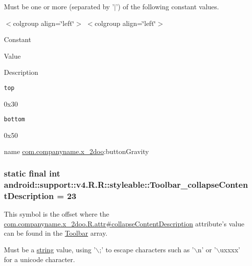 Must be one or more (separated by '$|$') of the following constant values. \begin{TabularC}{0}
\hline
\end{TabularC}
$<$colgroup align=\char`\"{}left\char`\"{}$>$ $<$colgroup align=\char`\"{}left\char`\"{}$>$ 

Constant

Value

Description 

{\tt top}

0x30

{\tt bottom}

0x50

name \hyperlink{namespacecom_1_1companyname_1_1x__2doo}{com.companyname.x\_\-2doo}:buttonGravity \hypertarget{classandroid_1_1support_1_1v4_1_1_r_1_1styleable_052a3e0cd00166bf0033ee070e9469d0}{
\subsubsection[{Toolbar\_\-collapseContentDescription}]{\setlength{\rightskip}{0pt plus 5cm}static final int android::support::v4.R.R::styleable::Toolbar\_\-collapseContentDescription = 23}}
\label{classandroid_1_1support_1_1v4_1_1_r_1_1styleable_052a3e0cd00166bf0033ee070e9469d0}


This symbol is the offset where the \hyperlink{classcom_1_1companyname_1_1x__2doo_1_1_r_1_1attr_1e672a257f5b406cbfc4774d38a8e4fd}{com.companyname.x\_\-2doo.R.attr\#collapseContentDescription} attribute's value can be found in the \hyperlink{classandroid_1_1support_1_1v4_1_1_r_1_1styleable_0646d71cfbd4a8645c7d805b33e1c574}{Toolbar} array.

Must be a \hyperlink{classandroid_1_1support_1_1v4_1_1_r_1_1string}{string} value, using '$\backslash$;' to escape characters such as '$\backslash$n' or '$\backslash$uxxxx' for a unicode character. 

